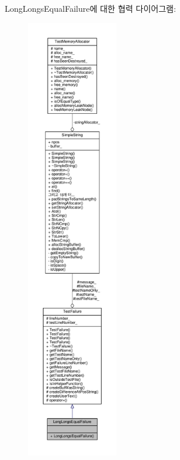 Long\+Longs\+Equal\+Failure에 대한 협력 다이어그램\+:
\nopagebreak
\begin{figure}[H]
\begin{center}
\leavevmode
\includegraphics[height=550pt]{class_long_longs_equal_failure__coll__graph}
\end{center}
\end{figure}
